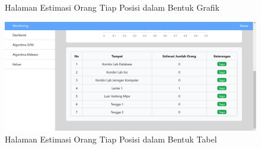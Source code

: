 \begin{enumerate}[a.]
\begin{figure}[H]
		      \caption{Halaman Estimasi Orang Tiap Posisi dalam Bentuk Grafik}
		      \label{Estimasi_Grafik}
	      \end{figure}
	      \begin{figure}[H]
		      \center
		      \includegraphics [width = 13.5 cm, height= 6.75 cm]{gambar/web/Estimasi_Tabel}
		      \caption{Halaman Estimasi Orang Tiap Posisi dalam Bentuk Tabel}
		      \label{Estimasi_Tabel}
	      \end{figure}
\end{enumerate}



